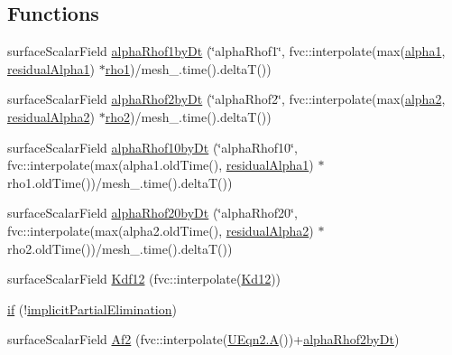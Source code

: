 \subsection*{Functions}
\begin{DoxyCompactItemize}
\item 
surface\+Scalar\+Field \hyperlink{pEqnf__2p_8H_a2d64c3faba87d892901391795a8140c2}{alpha\+Rhof1by\+Dt} (\char`\"{}alpha\+Rhof1\char`\"{}, fvc\+::interpolate(max(\hyperlink{UEqns__2p_8H_ad67e06bee4c61d3ec617e035493b4722}{alpha1}, \hyperlink{refsAndControls__2p_8H_a39053abc52660ee0829d85d9a9704f32}{residual\+Alpha1}) $\ast$\hyperlink{UEqns__2p_8H_a80ad9333a5b4812b1033ab05efb3a65d}{rho1})/mesh\+\_\+.\+time().deltaT())
\item 
surface\+Scalar\+Field \hyperlink{pEqnf__2p_8H_a8c8a7a840ca8aaf68650f5940b9b63e7}{alpha\+Rhof2by\+Dt} (\char`\"{}alpha\+Rhof2\char`\"{}, fvc\+::interpolate(max(\hyperlink{UEqns__2p_8H_abe544d8197b804c4439afde6d860d5d7}{alpha2}, \hyperlink{refsAndControls__2p_8H_a960fdd6ecc9e71702c858667a416d298}{residual\+Alpha2}) $\ast$\hyperlink{UEqns__2p_8H_a2a5e0e37e61560baf7b55ce8b70e01c0}{rho2})/mesh\+\_\+.\+time().deltaT())
\item 
surface\+Scalar\+Field \hyperlink{pEqnf__2p_8H_ad166e3b3df3df6495b5ad0367d2a6d03}{alpha\+Rhof10by\+Dt} (\char`\"{}alpha\+Rhof10\char`\"{}, fvc\+::interpolate(max(alpha1.\+old\+Time(), \hyperlink{refsAndControls__2p_8H_a39053abc52660ee0829d85d9a9704f32}{residual\+Alpha1}) $\ast$rho1.\+old\+Time())/mesh\+\_\+.\+time().deltaT())
\item 
surface\+Scalar\+Field \hyperlink{pEqnf__2p_8H_a3ed52d50799081db64c7604d23cd5d15}{alpha\+Rhof20by\+Dt} (\char`\"{}alpha\+Rhof20\char`\"{}, fvc\+::interpolate(max(alpha2.\+old\+Time(), \hyperlink{refsAndControls__2p_8H_a960fdd6ecc9e71702c858667a416d298}{residual\+Alpha2}) $\ast$rho2.\+old\+Time())/mesh\+\_\+.\+time().deltaT())
\item 
surface\+Scalar\+Field \hyperlink{pEqnf__2p_8H_a92926bf08983bca8c8d3bdade64d24c2}{Kdf12} (fvc\+::interpolate(\hyperlink{UEqns__2p_8H_a5bbf0de883575e238683e5a720a8e16e}{Kd12}))
\item 
\hyperlink{pEqnf__2p_8H_a5ae53f39028b227fab81abc22e3286d6}{if} (!\hyperlink{refsAndControls__2p_8H_a1d4f14edd4b410f2e95c2b58e5e49210}{implicit\+Partial\+Elimination})
\item 
surface\+Scalar\+Field \hyperlink{pEqnf__2p_8H_a2609adcc1d02fc916d8e7d77a9b6e4cc}{Af2} (fvc\+::interpolate(\hyperlink{solvePointKinetics_8H_af0b39a25157c5a983e067e9f3176f91f}{U\+Eqn2.\+A}())+\hyperlink{pEqnf__2p_8H_a8c8a7a840ca8aaf68650f5940b9b63e7}{alpha\+Rhof2by\+Dt})

\end{DoxyCompactItemize}
